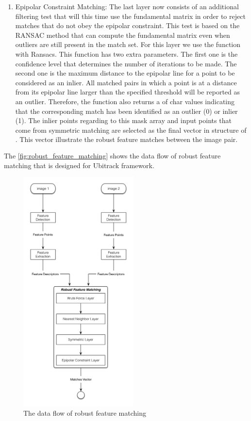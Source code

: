 \begin {enumerate}
  \item Epipolar Constraint Matching: The last layer now consists of an additional filtering test that will this time use the fundamental matrix in order to reject matches that do not obey the epipolar constraint. This test is based on the RANSAC method that can compute the fundamental matrix even when outliers are still present in the match set. For this layer we use the  function with Ransacs. This function has two extra parameters. The first one is the confidence level that determines the number of iterations to be made. The second one is the maximum distance to the epipolar line for a point to be considered as an inlier. All matched pairs in which a point is at a distance from its epipolar line larger than the specified threshold will be reported as an outlier. Therefore, the function also returns a  of char values indicating that the corresponding match has been identified as an outlier (0) or inlier (1). The inlier points regarding to this mask array and input points that come from symmetric matching are selected as the final vector in structure of . This vector illustrate the robust feature matches between the image pair.
\end {enumerate}

The \autoref{fig:robust_feature_matching} shows the data flow of robust feature matching that is designed for Ubitrack framework.
\begin{figure}[H]
  \centering
  \includegraphics[width=60mm]{figures/robust_feature_matching}
  \caption{The data flow of robust feature matching}\label{fig:robust_feature_matching}
\end{figure}

